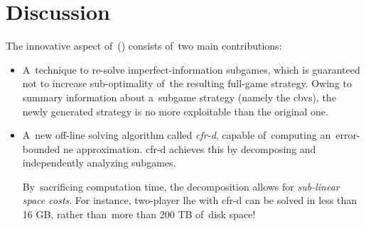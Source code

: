 \section{Discussion}
The innovative aspect of~(\cite{BurchJohansonBowling13}) consists of~two main contributions:
\begin{itemize}[(i)]
  \item A~technique to re-solve imperfect-information subgames, which is guaranteed not to increase sub-optimality of~the resulting full-game strategy.
    Owing to summary information about a~subgame strategy (namely the \acrlong{cbv}s), the newly generated strategy is no more exploitable than the original one.

  \item A~new off-line solving algorithm called \emph{\acrfull{cfr-d}}, capable of~computing an~error-bounded \acrshort{ne} approximation.
    \acrshort{cfr-d} achieves this by decomposing and independently analyzing subgames.

    By~sacrificing computation time, the decomposition allows for \emph{sub-linear space costs}.
    For instance, two-player \acrshort{lhe} with \acrshort{cfr-d} can be solved in less than 16 GB, rather than~more than 200 TB of~disk space!
\end{itemize}
